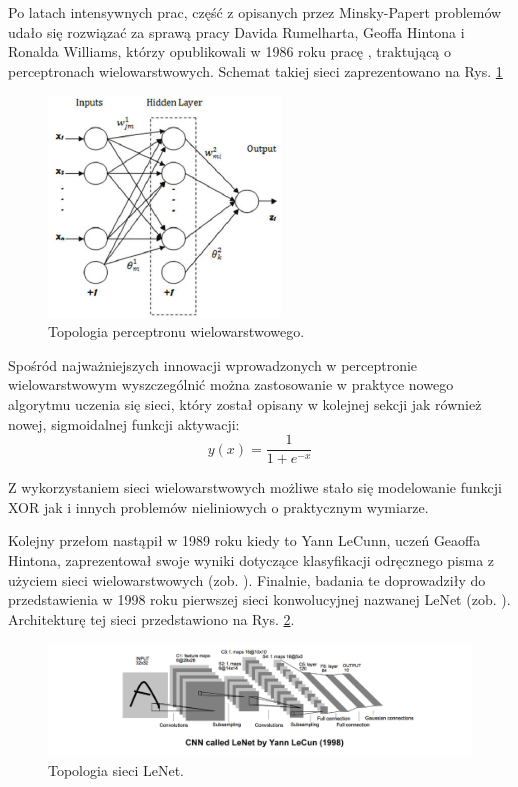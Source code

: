 Po latach intensywnych prac, część z opisanych przez Minsky-Papert problemów udało się rozwiązać za sprawą pracy Davida Rumelharta, Geoffa Hintona i Ronalda Williams, którzy opublikowali w 1986 roku pracę \cite{Rumelhart1986}, traktującą o perceptronach wielowarstwowych. Schemat takiej sieci zaprezentowano na Rys. \ref{MLperceptron}
\begin{figure}[h!]
	\centering
	\includegraphics[width=0.55\textwidth]{figures/MLperceptron.png}
	\caption{Topologia perceptronu wielowarstwowego.}
	\label{MLperceptron}
\end{figure}

Spośród najważniejszych innowacji wprowadzonych w perceptronie wielowarstwowym wyszczególnić można zastosowanie w praktyce nowego algorytmu uczenia się sieci, który został opisany w kolejnej sekcji jak również nowej, sigmoidalnej funkcji aktywacji:
\begin{equation}
\label{eqSigActFunc}
y(x) = \frac{1}{1 + e^{-x}}
\end{equation}

Z wykorzystaniem sieci wielowarstwowych możliwe stało się modelowanie funkcji XOR jak i innych problemów nieliniowych o praktycznym wymiarze. 

Kolejny przełom nastąpił w 1989 roku kiedy to Yann LeCunn, uczeń Geaoffa Hintona, zaprezentował swoje wyniki dotyczące klasyfikacji odręcznego pisma z użyciem sieci wielowarstwowych (zob. \cite{NIPS1989_293}). Finalnie, badania te doprowadziły do przedstawienia w 1998 roku pierwszej sieci konwolucyjnej nazwanej LeNet (zob. \cite{Lecun1998}). Architekturę tej sieci przedstawiono na Rys. \ref{LeNet}.
\begin{figure}[h!]
	\centering
	\includegraphics[width=1\textwidth]{figures/lenet.png}
	\caption{Topologia sieci LeNet.}
	\label{LeNet}
\end{figure}

